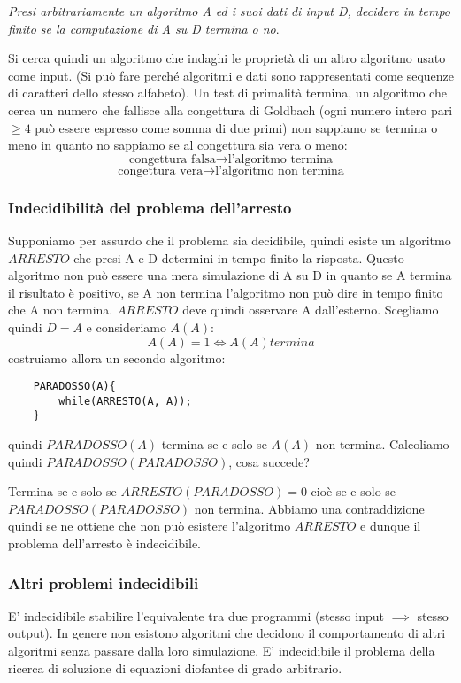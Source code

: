 \emph{Presi arbitrariamente un algoritmo A ed i suoi dati di input D, decidere in tempo finito se la computazione di A su D termina o no}.

Si cerca quindi un algoritmo che indaghi le proprietà di un altro algoritmo usato come input. (Si può fare perché algoritmi e dati sono rappresentati come sequenze di caratteri dello stesso alfabeto). Un test di primalità termina, un algoritmo che cerca un numero che fallisce alla congettura di Goldbach (ogni numero intero pari $\geq 4$ può essere espresso come somma di due primi) non sappiamo se termina o meno in quanto no sappiamo se al congettura sia vera o meno:
$$ \text{congettura falsa} \longrightarrow \text{l'algoritmo termina} $$
$$ \text{congettura vera} \longrightarrow \text{l'algoritmo non termina} $$

\subsubsection{Indecidibilità del problema dell'arresto}
Supponiamo per assurdo che il problema sia decidibile, quindi esiste un algoritmo $ARRESTO$ che presi A e D determini in tempo finito la risposta.
Questo algoritmo non può essere una mera simulazione di A su D in quanto se A termina il risultato è positivo, se A non termina l'algoritmo non può dire in tempo finito che A non termina. $ARRESTO$ deve quindi osservare A dall'esterno. Scegliamo quindi $D=A$ e consideriamo $A(A)$:
$$ A(A) = 1 \Longleftrightarrow A(A) termina $$
costruiamo allora un secondo algoritmo:
\begin{verbatim}
    PARADOSSO(A){
        while(ARRESTO(A, A));
    }
\end{verbatim}
quindi $PARADOSSO(A)$ termina se e solo se $A(A)$ non termina.
Calcoliamo quindi $PARADOSSO(PARADOSSO)$, cosa succede?

Termina se e solo se $ARRESTO(PARADOSSO) = 0$ cioè se e solo se $PARADOSSO(PARADOSSO)$ non termina.
Abbiamo una contraddizione quindi se ne ottiene che non può esistere l'algoritmo $ARRESTO$ e dunque il problema dell'arresto è indecidibile.

\subsubsection{Altri problemi indecidibili}
E' indecidibile stabilire l'equivalente tra due programmi (stesso input $\implies$ stesso output).
In genere non esistono algoritmi che decidono il comportamento di altri algoritmi senza passare dalla loro simulazione. E' indecidibile il problema della ricerca di soluzione di equazioni diofantee di grado arbitrario.


